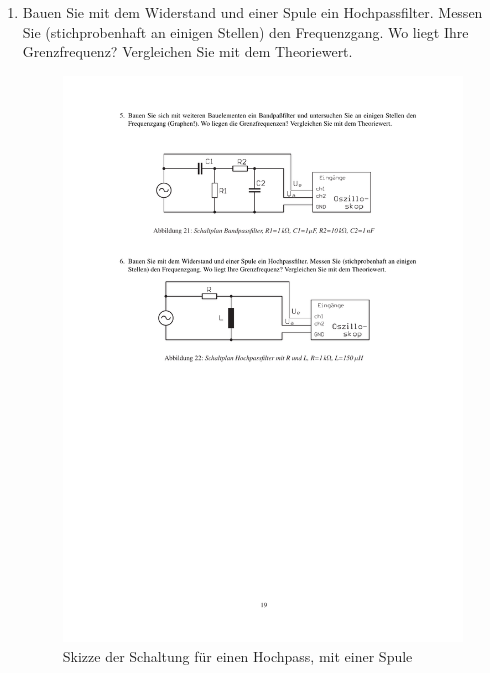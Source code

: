 \documentclass[12pt]{scrartcl}
\begin{document}
\begin{enumerate}
\begin{figure}[htbp]
\end{figure}
\newpage
{}
\item
Bauen Sie mit dem Widerstand und einer Spule ein Hochpassfilter. Messen Sie (stichprobenhaft an einigen Stellen) den Frequenzgang. Wo liegt Ihre Grenzfrequenz? Vergleichen Sie mit dem Theoriewert.
\begin{figure}[htbp] 
  \centering
    \includegraphics[trim = 20mm 155mm 1mm 105mm, clip, scale = 1]{bandpass_hochpass.pdf}
  	\caption[Skizze der Schaltung für einen Hochpass, mit einer Spule]{Skizze der Schaltung für einen Hochpass, mit einer Spule\footnotemark}
  \label{fig:Hochpass_spule}
\end{figure}

\end{enumerate}
\end{document}

